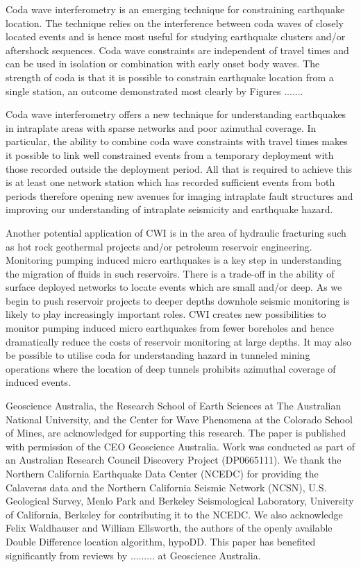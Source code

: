 \documentclass[extra]{gji}
\begin{document}
Coda wave interferometry is an emerging technique for constraining 
earthquake location. The technique relies on the interference between coda waves
of closely located events and is hence most useful
for studying earthquake clusters and/or aftershock sequences. 
Coda wave constraints are independent of travel times
and can be used in isolation or combination with early onset body waves. The strength of coda
is that it is possible to constrain earthquake location from a single station, 
an outcome demonstrated most clearly by Figures ....... 

Coda wave interferometry offers a new technique for understanding earthquakes in intraplate areas 
with sparse networks and poor azimuthal coverage.
In particular, the ability to combine coda wave constraints with travel times makes it possible
to link well constrained events from 
a temporary deployment with those recorded outside
the deployment period. All that is required to achieve this is at 
least one network station which has recorded
sufficient events from both periods therefore opening new avenues
for imaging intraplate fault structures and 
improving our understanding of intraplate seismicity and earthquake hazard.

Another potential application of CWI is in the area of hydraulic fracturing 
such as hot rock geothermal projects and/or
petroleum reservoir engineering. Monitoring pumping induced micro earthquakes is a key step in understanding
the migration of fluids in such reservoirs. There is a trade-off in the ability of surface deployed networks
to locate events which are small and/or deep. As we begin to push reservoir projects to deeper depths
downhole seismic monitoring is likely to play increasingly important roles. 
CWI creates new possibilities to monitor 
pumping induced micro earthquakes from fewer boreholes and
hence dramatically reduce the costs of reservoir monitoring at large depths. It may also be possible
to utilise coda for understanding hazard in tunneled mining operations where the 
location of deep tunnels prohibits
azimuthal coverage of induced events.




\begin{acknowledgments}
Geoscience Australia, the Research School of Earth Sciences at The
Australian National University, and the Center for Wave Phenomena at
the Colorado School of Mines, are acknowledged for supporting this
research. The paper is published with permission of the CEO
Geoscience Australia. Work was conducted as part of an Australian
Research Council Discovery Project (DP0665111). We thank the
Northern California Earthquake Data Center (NCEDC) for providing the
Calaveras data and the Northern California Seismic Network (NCSN),
U.S. Geological Survey, Menlo Park and Berkeley Seismological
Laboratory, University of California, Berkeley for contributing it
to the NCEDC. We also acknowledge Felix Waldhauser and William
Ellsworth, the authors of the openly available Double Difference
location algorithm, hypoDD. This paper has benefited significantly
from reviews by ......... at Geoscience Australia.
\end{acknowledgments}
\end{document}
